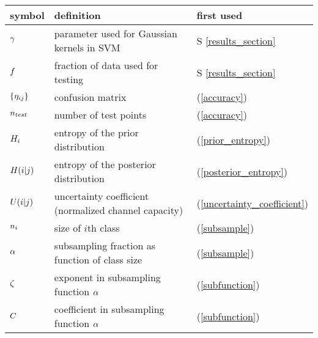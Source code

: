 

\begin{tabular}{lll}
symbol & definition & first used \\ \hline
	$\gamma$ & parameter used for Gaussian kernels in SVM & S \ref{results_section} \\
	$f$ & fraction of data used for testing & S \ref{results_section} \\
	$\lbrace \eta_{ij} \rbrace$ & confusion matrix & (\ref{accuracy}) \\
	$n_{test}$ & number of test points & (\ref{accuracy}) \\
	$H_i$ & entropy of the prior distribution & (\ref{prior_entropy}) \\
	$H(i|j)$ & entropy of the posterior distribution & (\ref{posterior_entropy}) \\
	$U(i|j)$ & uncertainty coefficient (normalized channel capacity) & (\ref{uncertainty_coefficient}) \\
	$n_i$ & size of $i$th class & (\ref{subsample}) \\
	$\alpha$ & subsampling fraction as function of class size & (\ref{subsample}) \\
	$\zeta$ & exponent in subsampling function $\alpha$ & (\ref{subfunction}) \\
	$C$ & coefficient in subsampling function $\alpha$ & (\ref{subfunction}) \\
\end{tabular}



